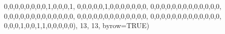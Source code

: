 \documentclass[
  letterpaper,
  DIV=11,
  numbers=noendperiod]{scrreprt}
\newenvironment{Shaded}{\begin{snugshade}}{\end{snugshade}}
\newcommand{\AttributeTok}[1]{\textcolor[rgb]{0.40,0.45,0.13}{#1}}
\newcommand{\ConstantTok}[1]{\textcolor[rgb]{0.56,0.35,0.01}{#1}}
\newcommand{\DecValTok}[1]{\textcolor[rgb]{0.68,0.00,0.00}{#1}}
\newcommand{\NormalTok}[1]{\textcolor[rgb]{0.00,0.23,0.31}{#1}}
\begin{document}
\begin{Shaded}
\begin{Highlighting}[]
              \DecValTok{0}\NormalTok{,}\DecValTok{0}\NormalTok{,}\DecValTok{0}\NormalTok{,}\DecValTok{0}\NormalTok{,}\DecValTok{0}\NormalTok{,}\DecValTok{0}\NormalTok{,}\DecValTok{0}\NormalTok{,}\DecValTok{0}\NormalTok{,}\DecValTok{1}\NormalTok{,}\DecValTok{0}\NormalTok{,}\DecValTok{0}\NormalTok{,}\DecValTok{0}\NormalTok{,}\DecValTok{1}\NormalTok{,}
              \DecValTok{0}\NormalTok{,}\DecValTok{0}\NormalTok{,}\DecValTok{0}\NormalTok{,}\DecValTok{0}\NormalTok{,}\DecValTok{0}\NormalTok{,}\DecValTok{1}\NormalTok{,}\DecValTok{0}\NormalTok{,}\DecValTok{0}\NormalTok{,}\DecValTok{0}\NormalTok{,}\DecValTok{0}\NormalTok{,}\DecValTok{0}\NormalTok{,}\DecValTok{0}\NormalTok{,}\DecValTok{0}\NormalTok{,}
              \DecValTok{0}\NormalTok{,}\DecValTok{0}\NormalTok{,}\DecValTok{0}\NormalTok{,}\DecValTok{0}\NormalTok{,}\DecValTok{0}\NormalTok{,}\DecValTok{0}\NormalTok{,}\DecValTok{0}\NormalTok{,}\DecValTok{0}\NormalTok{,}\DecValTok{0}\NormalTok{,}\DecValTok{0}\NormalTok{,}\DecValTok{0}\NormalTok{,}\DecValTok{0}\NormalTok{,}\DecValTok{0}\NormalTok{,}
              \DecValTok{0}\NormalTok{,}\DecValTok{0}\NormalTok{,}\DecValTok{0}\NormalTok{,}\DecValTok{0}\NormalTok{,}\DecValTok{0}\NormalTok{,}\DecValTok{0}\NormalTok{,}\DecValTok{0}\NormalTok{,}\DecValTok{0}\NormalTok{,}\DecValTok{0}\NormalTok{,}\DecValTok{0}\NormalTok{,}\DecValTok{0}\NormalTok{,}\DecValTok{0}\NormalTok{,}\DecValTok{0}\NormalTok{,}
              \DecValTok{0}\NormalTok{,}\DecValTok{0}\NormalTok{,}\DecValTok{0}\NormalTok{,}\DecValTok{0}\NormalTok{,}\DecValTok{0}\NormalTok{,}\DecValTok{0}\NormalTok{,}\DecValTok{0}\NormalTok{,}\DecValTok{0}\NormalTok{,}\DecValTok{0}\NormalTok{,}\DecValTok{0}\NormalTok{,}\DecValTok{0}\NormalTok{,}\DecValTok{0}\NormalTok{,}\DecValTok{0}\NormalTok{,}
              \DecValTok{0}\NormalTok{,}\DecValTok{0}\NormalTok{,}\DecValTok{0}\NormalTok{,}\DecValTok{0}\NormalTok{,}\DecValTok{0}\NormalTok{,}\DecValTok{0}\NormalTok{,}\DecValTok{0}\NormalTok{,}\DecValTok{0}\NormalTok{,}\DecValTok{0}\NormalTok{,}\DecValTok{0}\NormalTok{,}\DecValTok{0}\NormalTok{,}\DecValTok{0}\NormalTok{,}\DecValTok{0}\NormalTok{,}
              \DecValTok{0}\NormalTok{,}\DecValTok{0}\NormalTok{,}\DecValTok{0}\NormalTok{,}\DecValTok{1}\NormalTok{,}\DecValTok{0}\NormalTok{,}\DecValTok{0}\NormalTok{,}\DecValTok{1}\NormalTok{,}\DecValTok{1}\NormalTok{,}\DecValTok{0}\NormalTok{,}\DecValTok{0}\NormalTok{,}\DecValTok{0}\NormalTok{,}\DecValTok{0}\NormalTok{,}\DecValTok{0}\NormalTok{), }\DecValTok{13}\NormalTok{, }\DecValTok{13}\NormalTok{, }\AttributeTok{byrow=}\ConstantTok{TRUE}\NormalTok{)}


\end{Highlighting}
\end{Shaded}
\end{document}
